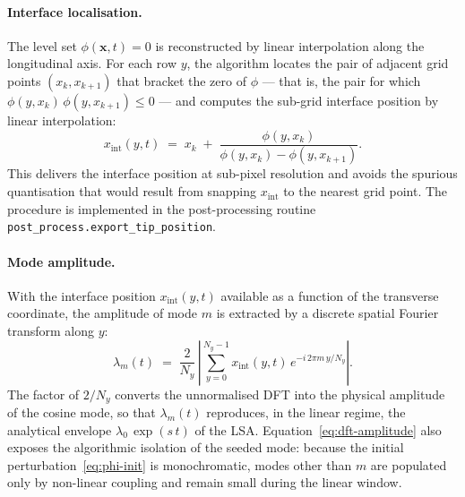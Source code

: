 \paragraph{Interface localisation.}
The level set $\phi(\bm{x}, t) = 0$ is reconstructed by linear interpolation along the longitudinal axis.
For each row $y$, the algorithm locates the pair of adjacent grid points $(x_k, x_{k+1})$ that bracket the zero of $\phi$ --- that is, the pair for which $\phi(y, x_k)\,\phi(y, x_{k+1}) \le 0$ --- and computes the sub-grid interface position by linear interpolation:
\begin{equation}
x_{\mathrm{int}}(y, t)
\;=\; x_k \;+\; \frac{\phi(y, x_k)}{\phi(y, x_k) - \phi(y, x_{k+1})}.
\label{eq:interface-localisation}
\end{equation}
This delivers the interface position at sub-pixel resolution and avoids the spurious quantisation that would result from snapping $x_{\mathrm{int}}$ to the nearest grid point.
The procedure is implemented in the post-processing routine \texttt{post\_process.export\_tip\_position}.

\paragraph{Mode amplitude.}
With the interface position $x_{\mathrm{int}}(y, t)$ available as a function of the transverse coordinate, the amplitude of mode $m$ is extracted by a discrete spatial Fourier transform along $y$:
\begin{equation}
\lambda_m(t) \;=\; \frac{2}{N_y}\,\left|\sum_{y=0}^{N_y-1} x_{\mathrm{int}}(y, t)\,e^{-i\,2\pi m\,y/N_y}\right|.
\label{eq:dft-amplitude}
\end{equation}
The factor of $2/N_y$ converts the unnormalised DFT into the physical amplitude of the cosine mode, so that $\lambda_m(t)$ reproduces, in the linear regime, the analytical envelope $\lambda_0\,\exp(s\,t)$ of the LSA.
Equation~\eqref{eq:dft-amplitude} also exposes the algorithmic isolation of the seeded mode: because the initial perturbation~\eqref{eq:phi-init} is monochromatic, modes other than $m$ are populated only by non-linear coupling and remain small during the linear window.

